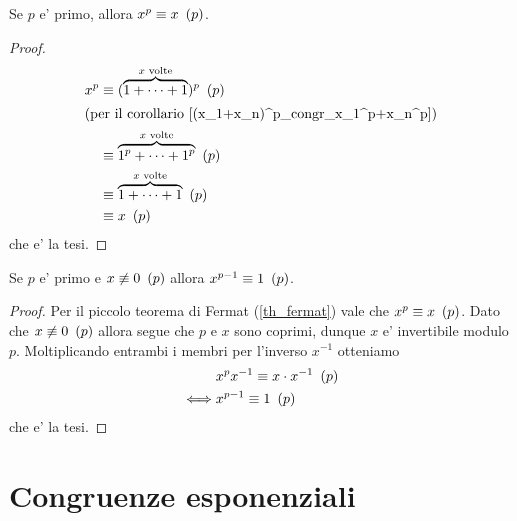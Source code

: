 \begin{theorem}
     \label{th_fermat}
    Se $p$ e' primo, allora $x^p \equiv x \ \left(p\right)$.
\end{theorem}
\begin{proof}
    \begin{alignat*}{1}
        x^p &\equiv (\overbrace{1 +\dots+ 1}^{x \text{ volte}})^p \ \left(p\right)\\
        \intertext{(per il corollario \ref{(x_1+x_n)^p_congr_x_1^p+x_n^p})}
        &\equiv \overbrace{1^p +\dots+ 1^p}^{x \text{ volte}} \ \left(p\right)\\
        &\equiv \overbrace{1 +\dots+ 1}^{x \text{ volte}} \ \left(p\right)\\
        &\equiv x \ \left(p\right)
    \end{alignat*}
    che e' la tesi.
\end{proof}

\begin{corollary} \label{corollario_fermat}
    Se $p$ e' primo e $x \not\equiv 0 \ \left(p\right)$ allora $x^{p-1} \equiv 1 \ \left(p\right)$.
\end{corollary}
\begin{proof}
    Per il piccolo teorema di Fermat (\ref{th_fermat}) vale che $x^p \equiv x \ \left(p\right)$. Dato che $x \not\equiv 0 \ \left(p\right)$ allora segue che $p$ e $x$ sono coprimi, dunque $x$ e' invertibile modulo $p$. Moltiplicando entrambi i membri per l'inverso $x^{-1}$ otteniamo \begin{alignat*}
        {1}
        &x^px^{-1} \equiv x\cdot x^{-1} \ \left(p\right)\\
        \iff &x^{p-1} \equiv 1 \ \left(p\right)
    \end{alignat*}
    che e' la tesi.    
\end{proof}

\section{Congruenze esponenziali}

